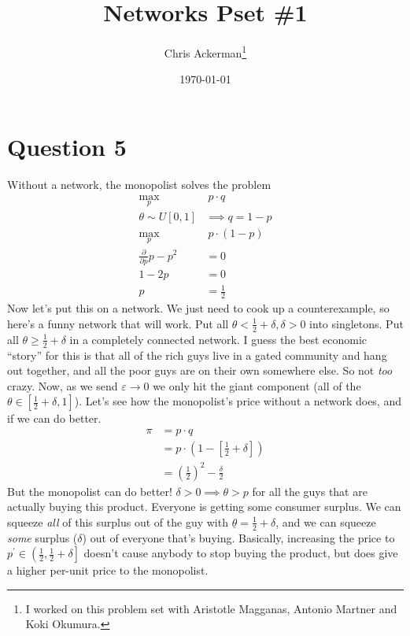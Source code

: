 
\newtheorem*{definition}{Definition}
\title{Networks Pset \#1}
\date{\today}

\author{Chris Ackerman\thanks{I worked on this problem set with Aristotle Magganas, Antonio Martner and Koki Okumura.}}

\maketitle
\section*{Question 5}
Without a network, the monopolist solves the problem
\begin{align*}
  \max_{p} &\ p \cdot q \tag{Assume $mc = 0$}\\
  \theta \sim U[0, 1] &\implies q  = 1 - p\\
  \max_p &\ p \cdot (1 - p)\\
  \frac{\partial}{\partial p} p - p^2 &= 0 \tag{FOC}\\
  1 - 2p &= 0\\
  p &= \frac{1}{2}
\end{align*}
Now let's put this on a network. We just need to cook up a counterexample, so here's a funny network that will work. Put all $\theta < \frac{1}{2} + \delta, \delta > 0$ into singletons. Put all $\theta \ge \frac{1}{2} + \delta$ in a completely connected network. I guess the best economic ``story'' for this is that all of the rich guys live in a gated community and hang out together, and all the poor guys are on their own somewhere else. So not \emph{too} crazy. Now, as we send $\varepsilon \to 0$ we only hit the giant component (all of the $\theta \in \left[\frac{1}{2} + \delta, 1\right]$). Let's see how the monopolist's price without a network does, and if we can do better.
\begin{align*}
  \pi &= p \cdot q\\
      &= p \cdot \left(1 - \left[\frac{1}{2} + \delta\right]\right)\\
  &= \left(\frac{1}{2}\right)^2 - \frac{\delta}{2}
\end{align*}
But the monopolist can do better! $\delta > 0 \implies \theta > p $ for all the guys that are actually buying this product. Everyone is getting some consumer surplus. We can squeeze \emph{all} of this surplus out of the guy with $\underline{\theta} = \frac{1}{2} + \delta$, and we can squeeze \emph{some} surplus ($\delta$) out of everyone that's buying. Basically, increasing the price to $p^\prime \in \left(\frac{1}{2}, \frac{1}{2} + \delta\right]$ doesn't cause anybody to stop buying the product, but does give a higher per-unit price to the monopolist.

